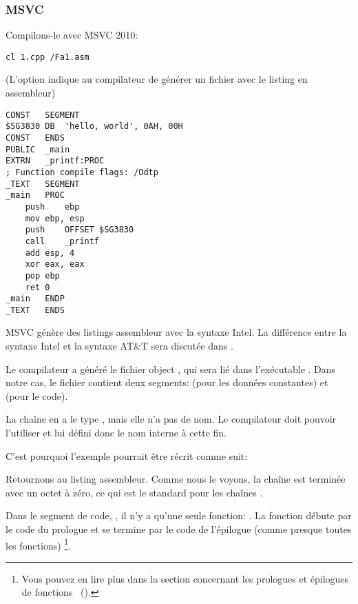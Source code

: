 \subsubsection{MSVC}

Compilons-le avec MSVC 2010:

\begin{lstlisting}
cl 1.cpp /Fa1.asm
\end{lstlisting}

(L'option  indique au compilateur de générer un fichier avec le listing en assembleur)

\begin{lstlisting}[caption=MSVC 2010,style=customasmx86]
CONST	SEGMENT
$SG3830	DB	'hello, world', 0AH, 00H
CONST	ENDS
PUBLIC	_main
EXTRN	_printf:PROC
; Function compile flags: /Odtp
_TEXT	SEGMENT
_main	PROC
	push	ebp
	mov	ebp, esp
	push	OFFSET $SG3830
	call	_printf
	add	esp, 4
	xor	eax, eax
	pop	ebp
	ret	0
_main	ENDP
_TEXT	ENDS
\end{lstlisting}

MSVC génère des listings assembleur avec la syntaxe Intel.
La différence entre la syntaxe Intel et la syntaxe AT\&T sera discutée dans .

Le compilateur a généré le fichier object , qui sera lié dans l'exécutable .
Dans notre cas, le fichier contient deux segments:  (pour les données constantes)
 et  (pour le code).

\label{string_is_const_char}
La chaîne  en \CCpp a le type , mais
elle n'a pas de nom.
Le compilateur doit pouvoir l'utiliser et lui défini donc le nom interne  à cette fin.

C'est pourquoi l'exemple pourrait être récrit comme suit:



Retournons au listing assembleur. Comme nous le voyons, la chaîne est terminée avec un octet à zéro, ce qui
est le standard pour les chaînes \CCpp.

Dans le segment de code, , il n'y a qu'une seule fonction: \main{}.
La fonction \main débute par le code du prologue et se termine par le code de l'épilogue 
(comme presque toutes les fonctions)
\footnote{Vous pouvez en lire plus dans la section concernant les prologues et épilogues de
fonctions ~().}.

